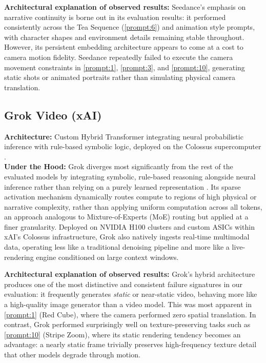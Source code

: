 \documentclass[sigconf]{acmart}
\begin{document}
\noindent\textbf{Architectural explanation of observed results:}
Seedance's emphasis on narrative continuity is borne out in its
evaluation results: it performed consistently across the Tea Sequence
(\ref{prompt:6}) and animation style prompts, with character
shapes and environment details remaining stable throughout. However,
its persistent embedding architecture appears to come at a cost to
camera motion fidelity. Seedance repeatedly failed to execute the
camera movement constraints in \ref{prompt:1}, \ref{prompt:3},
and \ref{prompt:10}, generating static shots or animated portraits
rather than simulating physical camera translation.

\subsection{Grok Video (xAI)}
\textbf{Architecture:} Custom Hybrid Transformer integrating neural
probabilistic inference with rule-based symbolic logic, deployed on
the Colossus supercomputer \cite{xai2025grok}. \\

\noindent\textbf{Under the Hood:} Grok diverges most significantly from
the rest of the evaluated models by integrating symbolic, rule-based
reasoning alongside neural inference rather than relying on a purely
learned representation \cite{xai2025grok}. Its sparse activation
mechanism dynamically routes compute to regions of high physical or
narrative complexity, rather than applying uniform computation across
all tokens, an approach analogous to Mixture-of-Experts (MoE) routing
but applied at a finer granularity. Deployed on NVIDIA H100 clusters
and custom ASICs within xAI's Colossus infrastructure, Grok also
natively ingests real-time multimodal data, operating less like a
traditional denoising pipeline and more like a live-rendering engine
conditioned on large context windows.

\noindent\textbf{Architectural explanation of observed results:} Grok's
hybrid architecture produces one of the most distinctive and consistent
failure signatures in our evaluation: it frequently generates
\textit{static} or near-static video, behaving more like a high-quality
image generator than a video model. This was most apparent in
\ref{prompt:1} (Red Cube), where the camera performed zero spatial
translation. In contrast, Grok performed
surprisingly well on texture-preserving tasks such as
\ref{prompt:10} (Stripe Zoom), where its static rendering tendency
becomes an advantage: a nearly static frame trivially preserves
high-frequency texture detail that other models degrade through motion.
\end{document}
